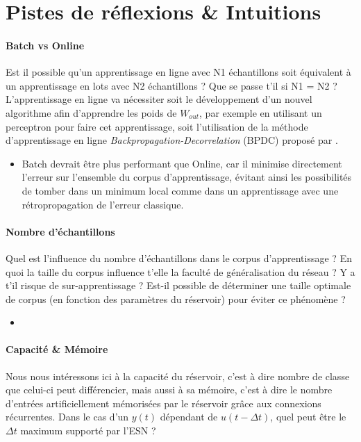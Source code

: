 \documentclass[12pt]{article}
\begin{document}
\section{Pistes de réflexions \& Intuitions}

\paragraph{Batch vs Online}
Est il possible qu'un apprentissage en ligne avec N1 échantillons soit équivalent à un apprentissage en lots avec N2 échantillons ? Que se passe t'il si N1 = N2 ? L'apprentissage en ligne va nécessiter soit le développement d'un nouvel algorithme afin d'apprendre les poids de $W_{out}$, par exemple en utilisant un perceptron pour faire cet apprentissage, soit l'utilisation de la méthode d'apprentissage en ligne \textit{Backpropagation-Decorrelation} (BPDC) proposé par \cite{Steil05}.

\begin{itemize}
\item Batch devrait être plus performant que Online, car il minimise directement l'erreur sur l'ensemble du corpus d'apprentissage, évitant ainsi les possibilités de tomber dans un minimum local comme dans un apprentissage avec une rétropropagation de l'erreur classique.
\end{itemize}

\paragraph{Nombre d'échantillons}
Quel est l'influence du nombre d'échantillons dans le corpus d'apprentissage ? En quoi la taille du corpus influence t'elle la faculté de généralisation du réseau ? Y a t'il risque de sur-apprentissage ? Est-il possible de déterminer une taille optimale de corpus (en fonction des paramètres du réservoir) pour éviter ce phénomène ?

\begin{itemize}
\item 
\end{itemize}

\paragraph{Capacité \& Mémoire}
Nous nous intéressons ici à la capacité du réservoir, c'est à dire nombre de classe que celui-ci peut différencier, mais aussi à sa mémoire, c'est à dire le nombre d'entrées artificiellement mémorisées par le réservoir grâce aux connexions récurrentes. Dans le cas d'un $y(t)$ dépendant de $u(t-\Delta t)$, quel peut être le $\Delta t$ maximum supporté par l'ESN ?
\end{document}
